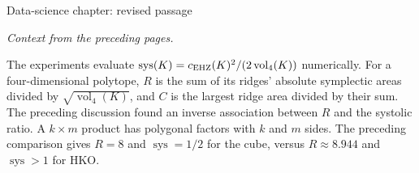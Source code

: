 \documentclass[a4paper,11pt]{article}
\begin{document}
\begin{center}
{\large Data-science chapter: revised passage}
\end{center}
\noindent\textit{Context from the preceding pages.}\par
\noindent The experiments evaluate
$\operatorname{sys}(K)=c_{\rm EHZ}(K)^2/(2\operatorname{vol}_4(K))$
numerically.
For a four-dimensional polytope, $R$ is the sum of its ridges' absolute
symplectic areas divided by $\sqrt{\operatorname{vol}_4(K)}$, and $C$ is
the largest ridge area divided by their sum. The preceding discussion
found an inverse association between $R$ and the systolic ratio.
A $k\times m$ product has polygonal factors with $k$ and $m$ sides.
The preceding comparison gives $R=8$ and $\operatorname{sys}=1/2$ for
the cube, versus $R\approx8.944$ and $\operatorname{sys}>1$ for HKO.
\medskip

\appendix

\printbibliography
\end{document}
